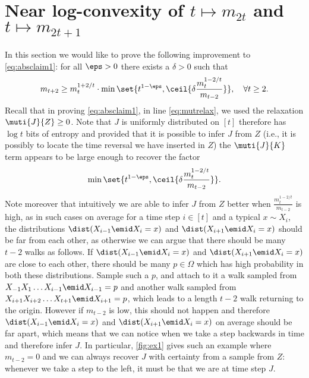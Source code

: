 \section{Near log-convexity of 
         $t\mapsto m_{2t}$ and $t\mapsto m_{2t+1}$}
\label{sec:heat:logconvex}

In this section we would like to prove the following
improvement to \autoref{eq:absclaim1}: for all $\eps>0$ 
there exists a $\delta>0$ such that
\begin{align}
m_{t+2}
\ge m_{t}^{1+2/t}\cdot
\min\set{t^{1-\eps}, \ceil{\delta\frac{m_t^{1-2/t}}{m_{t-2}}}},
\quad \forall t \ge 2.
\label{eq:logconv}
\end{align}
%
Recall that in proving \autoref{eq:absclaim1}, 
in line \ref{eq:mutrelax}, we used the relaxation 
$\muti{J}{Z}\ge 0$.
Note that $J$ is uniformly distributed on $[t]$
therefore has $\log t$ bits of entropy and provided
that it is possible to infer $J$ from $Z$ 
(i.e., it is possibly to locate the time reversal we 
have inserted in $Z$)
the $\muti{J}{K}$ term appears to be large enough to 
recover the factor
\begin{align*}
\min\set{t^{1-\eps}, 
  \ceil{\delta\frac{m_t^{1-2/t}}{m_{t-2}}}}.
\end{align*}
Note moreover that intuitively we are able to 
infer $J$ from $Z$ better when 
$\frac{m_t^{1-2/t}}{m_{t-2}}$ is high, 
as in such cases on average for a time step $i\in[t]$ 
and a typical $x\sim X_i$,
the distributions $\dist(X_{i-1}\emid X_i=x)$ and
$\dist(X_{i+1}\emid X_i=x)$ should be far from each other, 
as otherwise we can argue that there should be many $t-2$ 
walks as follows. If $\dist(X_{i-1}\emid X_i=x)$ and
$\dist(X_{i+1}\emid X_i=x)$ are close to each other, 
there should be many $p\in\Omega$ which has high probability
in both
these distributions. Sample such a $p$, and 
attach to it a walk sampled from $X_{-1}X_1\ldots X_{i-1}\emid X_{i-1}=p$ 
and another walk sampled from $X_{i+1}X_{i+2}\ldots X_{t+1}\emid X_{i+1}=p$,
which leads to a length $t-2$ walk returning to the origin.
However if $m_{t-2}$ is low, this should not happen and therefore
$\dist(X_{i-1}\emid X_i=x)$ and
$\dist(X_{i+1}\emid X_i=x)$ on average should be far apart, 
which means that we can notice when we take a step backwards in time
and therefore infer $J$. In particular, \autoref{fig:ex1} 
gives such an example where $m_{t-2}=0$ and we can always
recover $J$ with certainty from a sample from $Z$: whenever we take
a step to the left, it must be that we are at time step $J$.

